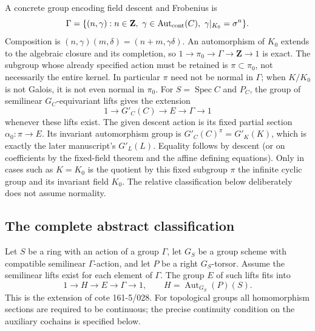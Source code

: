 A concrete group encoding field descent and Frobenius is
\[
 \Gamma=\{(n,\gamma):n\in\mathbf Z,
   \ \gamma\in\operatorname{Aut}_{\rm cont}(C),
   \ \gamma|_{K_0}=\sigma^n\}.
\]
Composition is $(n,\gamma)(m,\delta)=(n+m,\gamma\delta)$.
An automorphism of $K_0$ extends to the algebraic closure and its
completion, so
$1\to\pi_0\to\Gamma\to\mathbf Z\to1$ is exact.
The subgroup whose already specified action must be retained is
$\pi\subset\pi_0$, not necessarily the entire kernel.
In particular $\pi$ need not be normal in $\Gamma$; when $K/K_0$
is not Galois, it is not even normal in $\pi_0$.
For $S=\operatorname{Spec}C$ and $P_C$, the group of semilinear
$G_C$-equivariant lifts gives the extension
\[
 1\longrightarrow G'_C(C)\longrightarrow E\longrightarrow\Gamma
 \longrightarrow1
\]
whenever these lifts exist.  The given descent action is its fixed
partial section $\alpha_0:\pi\to E$.
Its invariant automorphism group is
$G'_C(C)^\pi=G'_K(K)$, which is exactly the later manuscript's
$G'_L(L)$.  Equality follows by descent (or on coefficients by the
fixed-field theorem and the affine defining equations).
Only in cases such as $K=K_0$ is the quotient by this fixed subgroup
$\pi$ the infinite cyclic group and its invariant field $K_0$.
The relative classification below deliberately does not assume
normality.

\subsection{The complete abstract classification}
Let $S$ be a ring with an action of a group $\Gamma$, let $G_S$ be a group
scheme with compatible semilinear $\Gamma$-action, and let $P$ be a right
$G_S$-torsor.  Assume the semilinear lifts exist for each element of
$\Gamma$.  The group $E$ of such lifts fits into
\[
 1\longrightarrow H\longrightarrow E\longrightarrow\Gamma
 \longrightarrow1,\qquad H=\operatorname{Aut}_{G_S}(P)(S).
\]
This is the extension of cote 161-5/028.  For topological groups all
homomorphism sections are required to be continuous; the precise continuity
condition on the auxiliary cochains is specified below.

